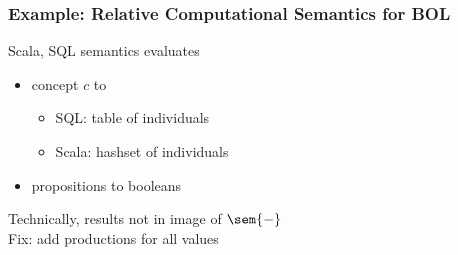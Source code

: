 
\begin{frame}\frametitle{Example: Relative Computational Semantics for BOL}
Scala, SQL semantics evaluates
\begin{itemize}
\item concept $c$ to
\begin{itemize}
\item SQL: table of individuals
\item Scala: hashset of individuals
\end{itemize}
\item propositions to booleans 
\end{itemize}

Technically, results not in image of $\sem{-}$\\
Fix: add productions for all values
\begin{commgrammar}
\\
\end{commgrammar}
\end{frame}

